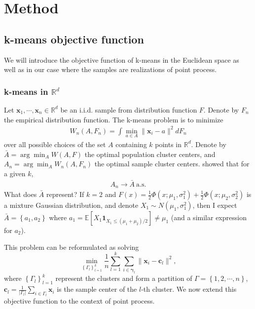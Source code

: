 

\section{Method}




	\subsection{k-means objective function}
		We will introduce the objective function of k-means in the Euclidean space as well as in our case where the samples are realizations of point process.
		\subsubsection*{k-means in $\mathbb{R}^d$} 
			Let ${\mathbf{x}_1,\cdots,\mathbf{x}_n}\in \mathbb{R}^d$ be an i.i.d. sample from distribution function $F$. Denote by $F_n$ the empirical distribution function. The k-means problem is to minimize 
			\begin{align*}
			W_n(A,F_n)=\int \min_{a\in A}\|\mathbf{x}_i-a\|^2  dF_n
			\end{align*}
			over all possible choices of the set $A$ containing $k$ points in $\mathbb{R}^d$.
			Denote by $\bar A = \arg\min_A W(A,F) $ the optimal population cluster centers, and $A_n = \arg\min_A W_n(A,F_n)$ the optimal sample cluster centers. \citet{Pollard1981a} showed that for a given $k$,
			\begin{align*}
			A_n\to \bar A \ \text{a.s.}
			\end{align*}
			{\color{red} What does $\bar A$ represent? If $k=2$ and $F(x)=\frac{1}{2}\Phi(x;\mu_1,\sigma_1^2)+\frac{1}{2}\Phi(x;\mu_2, \sigma_2^2)$ is a mixture Gaussian distribution, 
			and denote $X_1\sim N(\mu_1,\sigma_1^2)$, then I expect $\bar A= \left\{ a_1,a_2 \right\} $ where $a_1=\mathbb{E}[X_1 \mathbf{1}_{X_1\leq (\mu_1+\mu_2)/2}]\neq \mu_1 $ (and a similar expression for $a_2$). } 

			This problem can be reformulated as solving 
			\begin{equation}\label{eq:kmeans}
			\min_{\left\{ \Gamma_l \right\}_{l=1}^k}\frac{1}{n}\sum_{l=1}^k\sum_{i\in \mathbf{\gamma}_l} \|\mathbf{x}_i- \mathbf{c}_l\|^2,
			\end{equation}
			where $\left\{ \Gamma_l \right\}_{l=1}^k$ represent the clusters and form a partition of $\Gamma = \left\{ 1,2,\cdots,n \right\}$, $\mathbf{c}_l = \frac{1}{|\Gamma_l|}\sum_{i\in \Gamma_l}\mathbf{x}_i$ is the sample center of the $l$-th cluster. We now extend this objective function to the context of point process.
